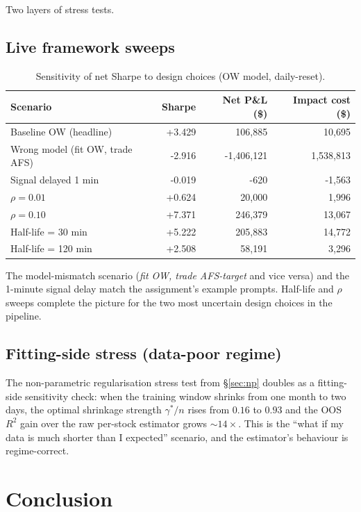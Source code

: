\documentclass[11pt,a4paper]{article}
\begin{document}
Two layers of stress tests.

\subsection{Live framework sweeps}

\begin{table}[H]
\centering\small
\caption{Sensitivity of net Sharpe to design choices (OW model, daily-reset).}
\label{tab:sens}
\begin{tabular}{lrrr}
\toprule
Scenario & Sharpe & Net P\&L (\$) & Impact cost (\$) \\
\midrule
Baseline OW (headline) & +3.429 & 106{,}885 & 10{,}695 \\
Wrong model (fit OW, trade AFS) & -2.916 & -1{,}406{,}121 & 1{,}538{,}813 \\
Signal delayed 1 min & -0.019 & -620 & -1{,}563 \\
$\rho=0.01$ & +0.624 & 20{,}000 & 1{,}996 \\
$\rho=0.10$ & +7.371 & 246{,}379 & 13{,}067 \\
Half-life = 30 min & +5.222 & 205{,}883 & 14{,}772 \\
Half-life = 120 min & +2.508 & 58{,}191 & 3{,}296 \\
\bottomrule
\end{tabular}
\end{table}

The model-mismatch scenario (\emph{fit OW, trade AFS-target} and vice
versa) and the 1-minute signal delay match the assignment's example
prompts.  Half-life and $\rho$ sweeps complete the picture for the
two most uncertain design choices in the pipeline.

\subsection{Fitting-side stress (data-poor regime)}

The non-parametric regularisation stress test from \S\ref{sec:np}
doubles as a fitting-side sensitivity check: when the training window
shrinks from one month to two days, the optimal shrinkage strength
$\gamma^*/n$ rises from $0.16$ to $0.93$ and the OOS $R^2$ gain over
the raw per-stock estimator grows ${\sim}14\times$.  This is the
``what if my data is much shorter than I expected'' scenario, and the
estimator's behaviour is regime-correct.

\section{Conclusion}
\end{document}
